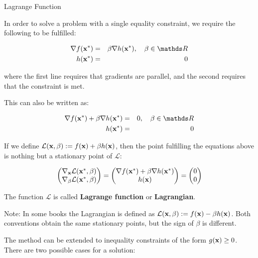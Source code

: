 \begin{vbframe}{Lagrange Function}

In order to solve a problem with a single equality constraint, we require the following to be fulfilled: 

\begin{eqnarray*}
\nabla f(\xv^\ast) &=& \beta \nabla h(\xv^\ast), \quad \beta \in \R\\
h(\xv^\ast) &=& 0
\end{eqnarray*}

where the first line requires that gradients are parallel, and the second requires that the constraint is met. 

\lz 

This can also be written as: 

\begin{eqnarray*}
\nabla f(\xv^\ast) + \beta \nabla h(\xv^\ast) &=& 0, \quad \beta \in \R\\
h(\xv^\ast) &=& 0
\end{eqnarray*}

\framebreak 

If we define $\mathcal{L}(\mathbf{x}, \beta) := f(\mathbf{x}) + \beta h(\mathbf{x})$, then the point fulfilling the equations above is nothing but a stationary point of $\mathcal{L}$: 

$$
  \begin{pmatrix}
  \nabla_{\mathbf{x}} \mathcal{L}(\mathbf{x}^\ast, \beta) \\
  \nabla_\beta \mathcal{L}(\mathbf{x}^\ast, \beta)
  \end{pmatrix} = \begin{pmatrix} \nabla f(\mathbf{x}^\ast) + \beta \nabla h(\mathbf{x}^\ast) \\
  h(\mathbf{x})
  \end{pmatrix} = \begin{pmatrix}
  0 \\ 0 \end{pmatrix}
$$

The function $\mathcal{L}$ is called \textbf{Lagrange function} or \textbf{Lagrangian}. 

\vspace*{0.2cm}

Note: In some books the Lagrangian is defined as $\mathcal{L}(\mathbf{x}, \beta) := f(\mathbf{x}) - \beta h(\mathbf{x})$. Both conventions obtain the same stationary points, but the sign of $\beta$ is different. 

\framebreak

The method can be extended to inequality constraints of the form $g(\mathbf{x}) \geq 0$. There are two possible cases for a solution: 


\end{vbframe}
